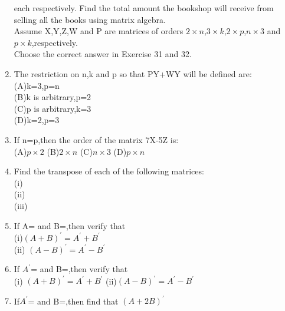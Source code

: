 \begin{enumerate}[label=\arabic*.,ref=\thesubsection.\theenumi]
  each respectively. Find the total amount the bookshop will receive from
selling all the books using matrix algebra.\\
Assume X,Y,Z,W and P are matrices of orders $2\times n$,$3 \times k$,$2\times p$,$n\times 3$ and $p\times k$,respectively.\\
Choose the correct answer in Exercise 31 and 32.\\
\item The restriction on n,k and p so that PY+WY will be defined are:\\
(A)k=3,p=n\\
 (B)k is arbitrary,p=2 \\
 (C)p is arbitrary,k=3 \\
 (D)k=2,p=3\\
\item If n=p,then the order of the matrix 7X-5Z is:\\
(A)$p \times 2$ (B)$2 \times n$ (C)$n \times 3$ (D)$p \times n$\\
\item Find the transpose of each of the following matrices:\\
(i)\\ (ii)\\ (iii)\\
\item If A= and B=,then verify that\\
(i)$(A+B)^{'}=A^{'}+B^{'}$ \\(ii) $(A-B)^{'}=A^{'}-B^{'}$\\
\item If $A^{'}$= and B=,then verify that\\
(i) $(A+B)^{'}=A^{'}+B^{'}$ (ii)$(A-B)^{'}=A^{'}-B^{'}$
\item If$ A^{'}$= and B=,then find that $(A+2B)^{'}$\\

\end{enumerate}
